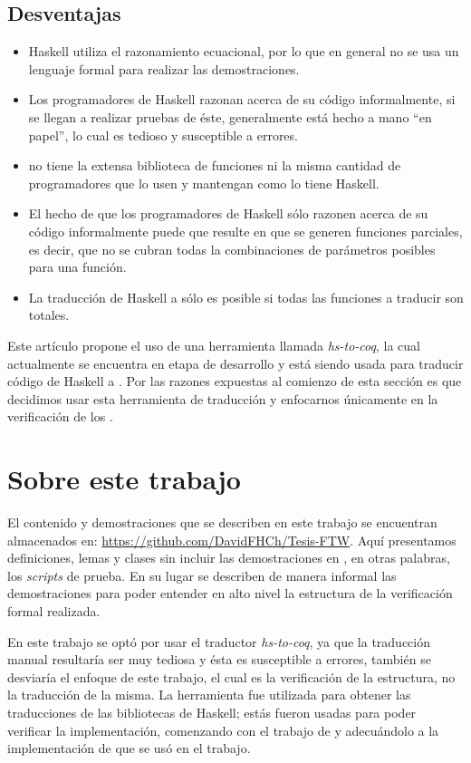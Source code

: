\subsection{Desventajas}
\begin{itemize}
    \item Haskell utiliza el razonamiento ecuacional, por lo que en general no se usa un lenguaje 
    formal para realizar las demostraciones.
    \item Los programadores de Haskell razonan acerca de su código informalmente, si se llegan a
    realizar pruebas de \'este, generalmente est\'a hecho a mano ``en papel'', lo cual es tedioso y
    susceptible a errores.
    \item {\coq} no tiene la extensa biblioteca de funciones ni la misma cantidad de programadores
    que lo usen y mantengan como lo tiene Haskell.
    \item El hecho de que los programadores de Haskell s\'olo razonen acerca de su código
    informalmente puede que resulte en que se generen funciones parciales, es decir, que no se
    cubran todas la combinaciones de parámetros posibles para una funci\'on.
    \item La traducci\'on de Haskell a {\coq} s\'olo es posible si todas las funciones a traducir 
    son totales.
\end{itemize}

Este art\'iculo propone el uso de una herramienta llamada \textit{hs-to-coq}, la cual actualmente se
encuentra en etapa de desarrollo y est\'a siendo usada para traducir código de Haskell a {\coq}. Por
las razones expuestas al comienzo de esta secci\'on es que decidimos usar esta herramienta de 
traducci\'on y enfocarnos \'unicamente en la verificaci\'on de los {\arns}.

\section{Sobre este trabajo}
El contenido y demostraciones que se describen en este trabajo se encuentran almacenados en:
\url{https://github.com/DavidFHCh/Tesis-FTW}. Aqu\'i presentamos definiciones, lemas y clases sin
incluir las demostraciones en {\coq}, en otras palabras, los \emph{scripts} de prueba. En su lugar se 
describen de manera informal las demostraciones para poder entender en alto nivel la estructura de 
la verificaci\'on formal realizada.

En este trabajo se opt\'o por usar el traductor \textit{hs-to-coq}, ya que la traducci\'on manual
resultar\'ia ser muy tediosa y \'esta es susceptible a errores, tambi\'en se desviaría el enfoque de
este trabajo, el cual es la verificaci\'on de la estructura, no la traducci\'on de la misma. La
herramienta fue utilizada para obtener las traducciones de las bibliotecas de Haskell; est\'as fueron
usadas para poder verificar la implementación, comenzando con el trabajo de \cite{tesisG} y 
adecuándolo a la implementaci\'on de \cite{MSetRBT} que se us\'o en el trabajo.

